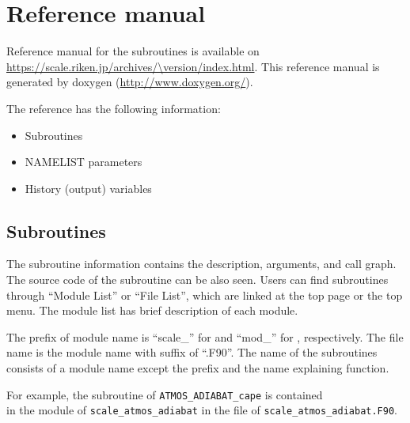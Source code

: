 \section{Reference manual} \label{sec:reference_manual}
Reference manual for the \scalelib subroutines is available on\\
\url{https://scale.riken.jp/archives/\version/index.html}.
This reference manual is generated by doxygen (\url{http://www.doxygen.org/}).

The reference has the following information:
\begin{itemize}
\item Subroutines
\item NAMELIST parameters
\item History (output) variables
\end{itemize}


\subsection{Subroutines}
The subroutine information contains the description, arguments, and call graph.
The source code of the subroutine can be also seen.
Users can find subroutines through ``Module List'' or ``File List'', which are linked at the top page or the top menu.
The module list has brief description of each module.

The prefix of module name is ``scale\_'' for \scalelib and ``mod\_'' for \scalerm, respectively.
The file name is the module name with suffix of ``.F90''.
The name of the subroutines consists of a module name except the prefix and the name explaining function.

For example, the subroutine of \verb|ATMOS_ADIABAT_cape| is contained \\
in the module of \verb|scale_atmos_adiabat| in the file of \verb|scale_atmos_adiabat.F90|.



